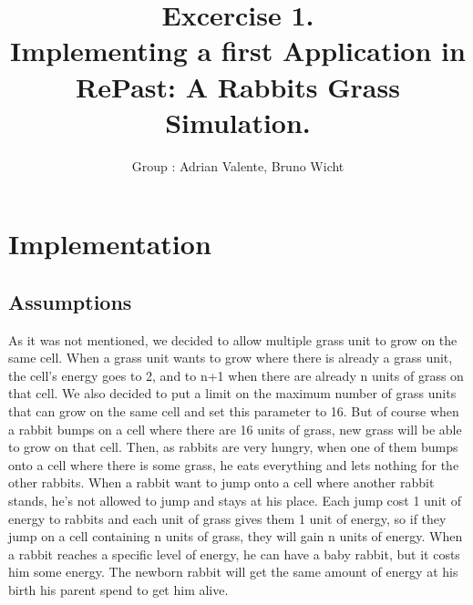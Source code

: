 \documentclass[11pt]{article}
\title{\bf Excercise 1.\\ Implementing a first Application in RePast: A Rabbits Grass Simulation.}
\author{Group \textnumero: Adrian Valente, Bruno Wicht}
\begin{document}
\maketitle

\section{Implementation}

\subsection{Assumptions}
As it was not mentioned, we decided to allow multiple grass unit to grow on the same cell. When a grass unit wants to grow where there is already a grass unit, the cell's energy goes to 2, and to n+1 when there are already n units of grass on that cell. We also decided to put a limit on the maximum number of grass units that can grow on the same cell and set this parameter to 16. But of course when a rabbit bumps on a cell where there are 16 units of grass, new grass will be able to grow on that cell. 
\newline
Then, as rabbits are very hungry, when one of them bumps onto a cell where there is some grass, he eats everything and lets nothing for the other rabbits.
\newline
When a rabbit want to jump onto a cell where another rabbit stands, he's not allowed to jump and stays at his place.
\newline 
Each jump cost 1 unit of energy to rabbits and each unit of grass gives them 1 unit of energy, so if they jump on a cell containing n units of grass, they will gain n units of energy.
\newline
When a rabbit reaches a specific level of energy, he can have a baby rabbit, but it costs him some energy. The newborn rabbit will get the same amount of energy at his birth his parent spend to get him alive. 
\end{document}
